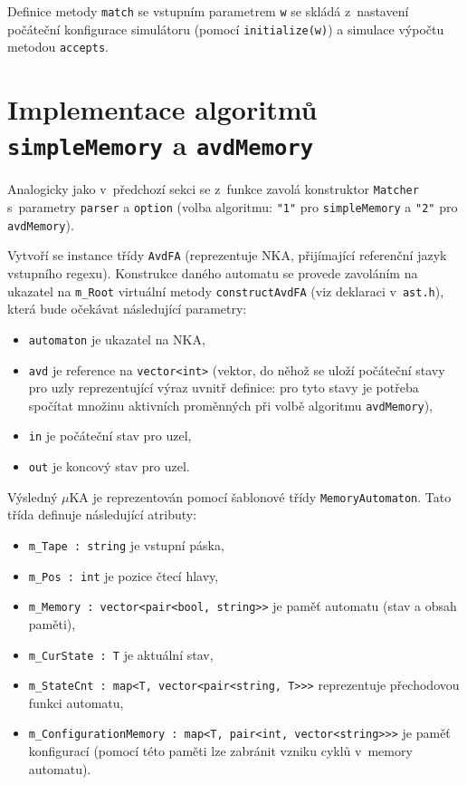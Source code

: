 \documentclass[thesis=B,czech]{FITthesis}[2019/12/23]
\theoremstyle{definition}
\begin{document}
Definice metody \texttt{match} se vstupním parametrem \texttt{w} se skládá z~nastavení počáteční konfigurace simulátoru (pomocí \texttt{initialize(w)}) a simulace výpočtu  metodou \texttt{accepts}.
\section{Implementace algoritmů \texttt{simpleMemory} a \texttt{avdMemory}}\label{sec:implAvd}
Analogicky jako v~předchozí sekci se z~funkce  zavolá konstruktor \texttt{Matcher} s~parametry \texttt{parser} a \texttt{option} (volba algoritmu: \texttt{"1"} pro \texttt{simpleMemory} a \texttt{"2"} pro \texttt{avdMemory}). 

Vytvoří se instance třídy \texttt{AvdFA} (reprezentuje NKA, přijímající referenční jazyk vstupního regexu). Konstrukce daného automatu se provede zavoláním na ukazatel na \texttt{m\_Root} virtuální metody \texttt{constructAvdFA} (viz deklaraci v~\texttt{ast.h}), která bude očekávat následující parametry:
\begin{itemize}
	\item{\texttt{automaton} je ukazatel na NKA,}
	\item{\texttt{avd} je reference na \texttt{vector<int>} (vektor, do něhož se uloží počáteční stavy pro uzly reprezentující výraz uvnitř definice: pro tyto stavy je potřeba spočítat množinu aktivních proměnných při volbě algoritmu \texttt{avdMemory}),}
	\item{\texttt{in} je počáteční stav pro uzel,}
	\item{\texttt{out} je koncový stav pro uzel.}	
\end{itemize} 

Výsledný $\mu$KA je reprezentován pomocí šablonové třídy \texttt{MemoryAutomaton}. Tato třída definuje následující atributy: 
\begin{itemize} 
	\item{\texttt{m\_Tape : string} je vstupní páska,}
	\item{\texttt{m\_Pos : int} je pozice čtecí hlavy,}
	\item{\texttt{m\_Memory : vector<pair<bool, string>>} je paměť automatu (stav a obsah paměti),}
	\item{\texttt{m\_CurState : T} je aktuální stav,}
	\item{\texttt{m\_StateCnt :  map<T, vector<pair<string, T>>>} reprezentuje přechodovou funkci automatu,}
	\item{\texttt{m\_ConfigurationMemory : map<T, pair<int, vector<string>>>} je paměť konfigurací (pomocí této paměti lze zabránit vzniku cyklů v~memory automatu).}
\end{itemize}
\end{document}
